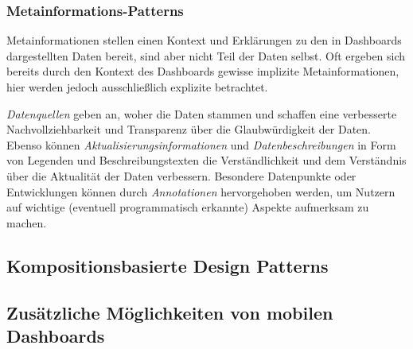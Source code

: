 \subsubsection{Metainformations-Patterns}\label{subsubsec:meta-information-patterns}

Metainformationen stellen einen Kontext und Erklärungen zu den in Dashboards dargestellten Daten bereit, sind aber nicht Teil der Daten selbst.
Oft ergeben sich bereits durch den Kontext des Dashboards gewisse implizite Metainformationen, hier werden jedoch ausschließlich explizite betrachtet.

\emph{Datenquellen} geben an, woher die Daten stammen und schaffen eine verbesserte Nachvollziehbarkeit und Transparenz über die Glaubwürdigkeit der Daten.
Ebenso können \emph{Aktualisierungsinformationen} und \emph{Datenbeschreibungen} in Form von Legenden und Beschreibungstexten die Verständlichkeit und dem Verständnis über die Aktualität der Daten verbessern.
Besondere Datenpunkte oder Entwicklungen können durch \emph{Annotationen} hervorgehoben werden, um Nutzern auf wichtige (eventuell programmatisch erkannte) Aspekte aufmerksam zu machen.

\subsection{Kompositionsbasierte Design Patterns}\label{subsec:conposition-design-patterns}

\subsection{Zusätzliche Möglichkeiten von mobilen Dashboards}\label{subsec:additional-capabilities-of-mobile-dashboards}

